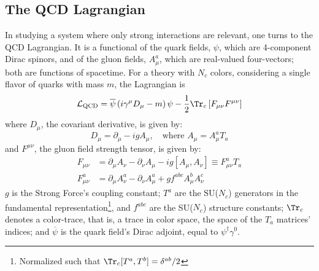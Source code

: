\chapter{}

\section{The QCD Lagrangian}

In studying a system where only strong interactions are relevant, one turns to the QCD Lagrangian. It is a functional of the quark fields, $\psi$, which are 4-component Dirac spinors, and of the gluon fields, $A^a_\mu$, which are real-valued four-vectors; both are functions of spacetime. For a theory with $N_c$ colors, considering a single flavor of quarks with mass $m$,
the Lagrangian is
\begin{equation}
	\mathcal{L}_\text{QCD} = \overline{\psi} \left(i \gamma^\mu D_\mu - m \right) \psi - \frac{1}{2} \Tr_c \left[ F_{\mu \nu} F^{\mu \nu} \right] %
	\label{eq:QCD_Lagrangian}
\end{equation}
where $D_\mu$, the covariant derivative, is given by:
\begin{equation}
	D_\mu =  \partial_\mu - i g A_\mu, \quad \text{where }  A_\mu = A_\mu^a T_a
\end{equation}
and $F^{\mu \nu}$, the gluon field strength tensor, is given by:
\begin{equation}
	\begin{split}
		F_{\mu \nu} & = \partial_\mu A_\nu - \partial_\nu A_\mu - ig [A_\mu, A_\nu] \equiv F_{\mu \nu}^a T_a\\
		F_{\mu \nu}^a & = \partial_\mu A_\nu^a - \partial_\nu A_\mu^a + g f^{a b c} A^b_\mu A^c_\nu
	\end{split}
\end{equation}
$g$ is the Strong Force's coupling constant; $T^a$ are the SU($N_c$) generators in the fundamental representation\footnote{Normalized such that $\Tr_c [T^a, T^b] = \delta^{ab}/2$}, and $f^{abc}$ are the SU($N_c$) structure constants; $\Tr_c$ denotes a color-trace, that is, a trace in color space, the space of the $T_a$ matrices' indices; and $\overline{\psi}$ is the quark field's Dirac adjoint, equal to $ \psi^\dagger \gamma^0$.

